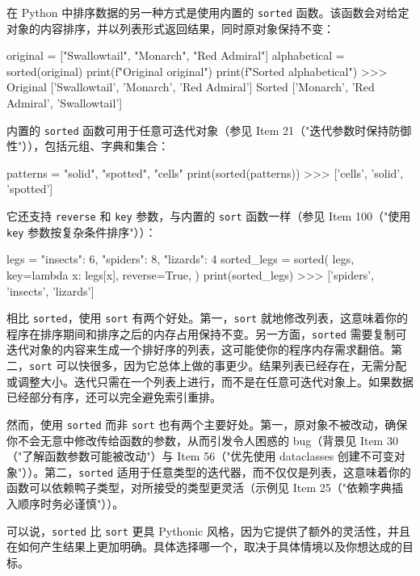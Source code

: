 在 Python 中排序数据的另一种方式是使用内置的 \texttt{sorted} 函数。该函数会对给定对象的内容排序，并以列表形式返回结果，同时原对象保持不变：

\begin{codebox}[python]
original = ["Swallowtail", "Monarch", "Red Admiral"]
alphabetical = sorted(original)
print(f"Original {original}")
print(f"Sorted   {alphabetical}")
>>>
Original ['Swallowtail', 'Monarch', 'Red Admiral']
Sorted   ['Monarch', 'Red Admiral', 'Swallowtail']
\end{codebox}

内置的 \texttt{sorted} 函数可用于任意可迭代对象（参见 Item 21（"迭代参数时保持防御性"）），包括元组、字典和集合：

\begin{codebox}[python]
patterns = {"solid", "spotted", "cells"}
print(sorted(patterns))
>>>
['cells', 'solid', 'spotted']
\end{codebox}

它还支持 \texttt{reverse} 和 \texttt{key} 参数，与内置的 \texttt{sort} 函数一样（参见 Item 100（"使用 \texttt{key} 参数按复杂条件排序"））：

\begin{codebox}[python]
legs = {"insects": 6, "spiders": 8, "lizards": 4}
sorted_legs = sorted(
    legs,
    key=lambda x: legs[x],
    reverse=True,
)
print(sorted_legs)
>>>
['spiders', 'insects', 'lizards']
\end{codebox}

相比 \texttt{sorted}，使用 \texttt{sort} 有两个好处。第一，\texttt{sort} 就地修改列表，这意味着你的程序在排序期间和排序之后的内存占用保持不变。另一方面，\texttt{sorted} 需要复制可迭代对象的内容来生成一个排好序的列表，这可能使你的程序内存需求翻倍。第二，\texttt{sort} 可以快很多，因为它总体上做的事更少。结果列表已经存在，无需分配或调整大小。迭代只需在一个列表上进行，而不是在任意可迭代对象上。如果数据已经部分有序，还可以完全避免索引重排。

然而，使用 \texttt{sorted} 而非 \texttt{sort} 也有两个主要好处。第一，原对象不被改动，确保你不会无意中修改传给函数的参数，从而引发令人困惑的 bug（背景见 Item 30（"了解函数参数可能被改动"）与 Item 56（"优先使用 dataclasses 创建不可变对象"））。第二，\texttt{sorted} 适用于任意类型的迭代器，而不仅仅是列表，这意味着你的函数可以依赖鸭子类型，对所接受的类型更灵活（示例见 Item 25（"依赖字典插入顺序时务必谨慎"））。

可以说，\texttt{sorted} 比 \texttt{sort} 更具 Pythonic 风格，因为它提供了额外的灵活性，并且在如何产生结果上更加明确。具体选择哪一个，取决于具体情境以及你想达成的目标。

